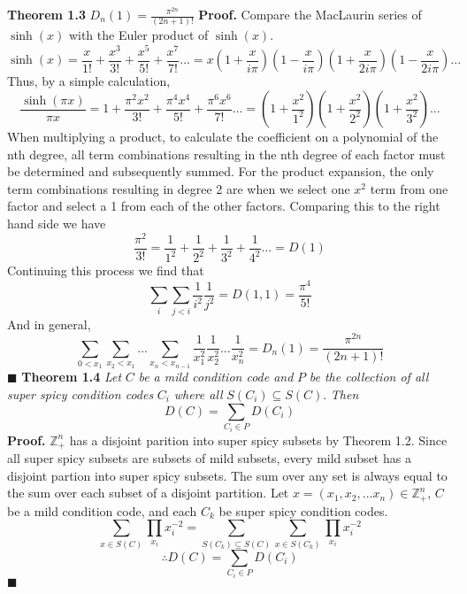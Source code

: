 \documentclass[12pt]{article}
\begin{document}
\textbf{Theorem 1.3} \(D_n(1)=\frac{\pi^{2n}}{(2n+1)!}\)
\newline
\textbf{Proof.}\newline
Compare the MacLaurin series of \(\sinh(x)\) with the Euler product of \(\sinh(x)\).
\[\sinh(x)=\frac{x}{1!} + \frac{x^3}{3!} + \frac{x^5}{5!} + \frac{x^7}{7!}... =x\left(1+\frac{x}{i\pi}\right)\left(1-\frac{x}{i\pi}\right)\left(1+\frac{x}{2i\pi}\right)\left(1-\frac{x}{2i\pi}\right)...\]
Thus, by a simple calculation,
\[\frac{\sinh(\pi x)}{\pi x}=1+\frac{\pi^2x^2}{3!}+\frac{\pi^4x^4}{5!}+\frac{\pi^6x^6}{7!}...=\left(1+\frac{x^2}{1^2}\right)\left(1+\frac{x^2}{2^2}\right)\left(1+\frac{x^2}{3^2}\right)...\]
\newline
When multiplying a product, to calculate the coefficient on a polynomial of the nth degree, all term combinations resulting in the nth degree of each factor must be determined and subsequently summed. \newline
\newline
For the product expansion, the only term combinations resulting in degree 2 are when we select one \(x^2\) term from one factor and select a 1 from each of the other factors. Comparing this to the right hand side we have
\[\frac{\pi^2}{3!}=\frac{1}{1^2}+\frac{1}{2^2}+\frac{1}{3^2}+\frac{1}{4^2}...=D(1)\]
\newline
\newline
Continuing this process we find that
\[\sum_i\sum_{j<i}\frac{1}{i^2}\frac{1}{j^2}=D(1,1)=\frac{\pi^4}{5!}\]
And in general,
\[\sum_{0<x_1}\sum_{x_2<x_1}...\sum_{x_n<x_{n-1}}\frac{1}{x_1^2}\frac{1}{x_2^2}...\frac{1}{x_n^2}=D_n(1)=\frac{\pi^{2n}}{(2n+1)!}\]
\(\blacksquare\)
\newline
\newline
\textbf{Theorem 1.4} \textit{Let } \(C\) \textit{ be a mild condition code and } \(P\) \textit{ be the collection of all super spicy condition codes } \(C_i\) \textit{ where all }\(S(C_i)\subseteq S(C)\).\textit{ Then } \[D(C)=\sum_{C_i\in P}D(C_i)\]
\textbf{Proof. }
\newline
\(\mathbb{Z}_+^n\) has a disjoint parition into super spicy subsets by Theorem 1.2. \newline
Since all super spicy subsets are subsets of mild subsets, every mild subset has a disjoint partion into super spicy subsets.
\newline
\newline
The sum over any set is always equal to the sum over each subset of a disjoint partition.
\newline
Let \(x = (x_1,x_2,...x_n)\in \mathbb{Z}_+^n\), \(C\) be a mild condition code, and each \(C_k\) be super spicy condition codes.
\[\sum_{x \in S(C)}\prod_{x_i}x_i^{-2}=\sum_{S(C_k)\subseteq S(C)}\sum_{x \in S(C_k)}\prod_{x_i}x_i^{-2}\]
\[\therefore D(C)=\sum_{C_i\in P}D(C_i)\]
\(\blacksquare\) \newline
\newpage
\end{document}
